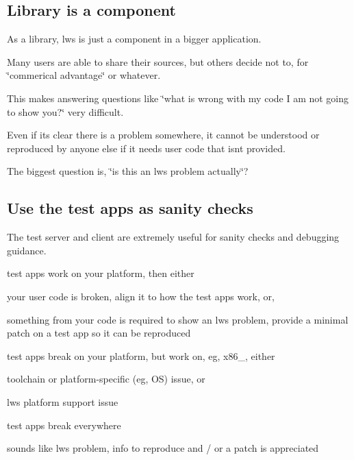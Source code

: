\subsection*{Library is a component }

As a library, lws is just a component in a bigger application.

Many users are able to share their sources, but others decide not to, for \char`\"{}commerical advantage\char`\"{} or whatever.

This makes answering questions like \char`\"{}what is wrong with my code I am not
going to show you?\char`\"{} very difficult.

Even if it\textquotesingle{}s clear there is a problem somewhere, it cannot be understood or reproduced by anyone else if it needs user code that isn\textquotesingle{}t provided.

The biggest question is, \char`\"{}is this an lws problem actually\char`\"{}?

\subsection*{Use the test apps as sanity checks }

The test server and client are extremely useful for sanity checks and debugging guidance.


\begin{DoxyItemize}
\item test apps work on your platform, then either
\begin{DoxyItemize}
\item your user code is broken, align it to how the test apps work, or,
\item something from your code is required to show an lws problem, provide a minimal patch on a test app so it can be reproduced
\end{DoxyItemize}
\item test apps break on your platform, but work on, eg, x86\+\_, either
\begin{DoxyItemize}
\item toolchain or platform-\/specific (eg, OS) issue, or
\item lws platform support issue
\end{DoxyItemize}
\item test apps break everywhere
\begin{DoxyItemize}
\item sounds like lws problem, info to reproduce and / or a patch is appreciated 
\end{DoxyItemize}
\end{DoxyItemize}